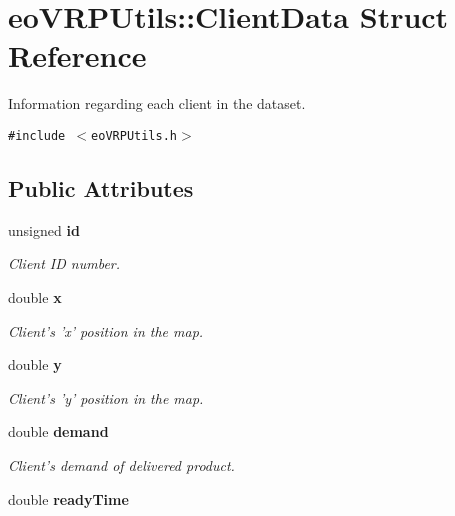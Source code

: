 \section{eo\-VRPUtils::Client\-Data Struct Reference}
\label{structeo_v_r_p_utils_1_1_client_data}
Information regarding each client in the dataset.  


{\tt \#include $<$eo\-VRPUtils.h$>$}

\subsection*{Public Attributes}
\begin{CompactItemize}
\item 
unsigned \bf{id}\label{structeo_v_r_p_utils_1_1_client_data_c6496a0fce64b8b6babe12b2446c1050}

\begin{CompactList}\small\item\em Client ID number. \item\end{CompactList}\item 
double \bf{x}\label{structeo_v_r_p_utils_1_1_client_data_fb30df4148eb916a1785ecd823b02316}

\begin{CompactList}\small\item\em Client's 'x' position in the map. \item\end{CompactList}\item 
double \bf{y}\label{structeo_v_r_p_utils_1_1_client_data_3164fdd2b99e9b3c565ba3f8ff05c0da}

\begin{CompactList}\small\item\em Client's 'y' position in the map. \item\end{CompactList}\item 
double \bf{demand}\label{structeo_v_r_p_utils_1_1_client_data_3834669c3b0da0592c20a2349b1284cb}

\begin{CompactList}\small\item\em Client's demand of delivered product. \item\end{CompactList}\item 
double \bf{ready\-Time}\label{structeo_v_r_p_utils_1_1_client_data_d9f6b6b3a9e7431145f6049f13e90255}


\end{CompactItemize}

